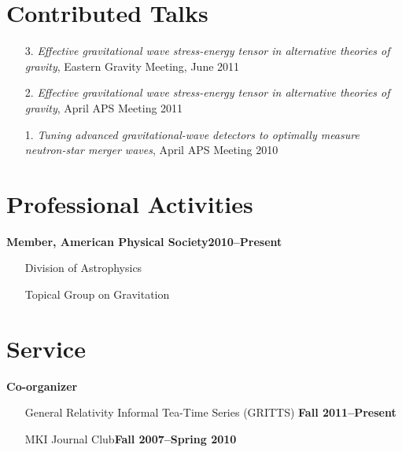 \documentclass[margin,line]{res}
\begin{document}
\begin{resume}
\section{\sc Contributed Talks}
\begin{enumerate}
\item[{3.}] {\it Effective gravitational wave stress-energy tensor in
    alternative theories of gravity}, Eastern Gravity Meeting, June 2011
\item[{2.}] {\it Effective gravitational wave stress-energy tensor in alternative theories of gravity}, April APS Meeting 2011
\item[{1.}] {\it Tuning advanced gravitational-wave detectors to
    optimally measure neutron-star merger waves}, April APS Meeting 2010
\end{enumerate}

\section{\sc Professional Activities}
{\bf Member, American Physical Society}\hfill{\bf 2010--Present}
\vspace*{.05in}  
\begin{itemize}
\item[] Division of Astrophysics
\item[] Topical Group on Gravitation
\end{itemize}

\section{\sc Service}
{\bf Co-organizer}
\vspace*{.05in}
\begin{itemize}
\item[] General Relativity Informal Tea-Time Series (GRITTS)\hfill {\bf
    Fall 2011--Present}
\item[] MKI Journal Club\hfill {\bf Fall 2007--Spring 2010}
\end{itemize}

\end{resume}
\end{document}
